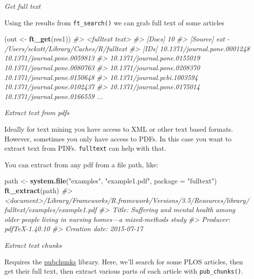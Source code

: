 \documentclass[author-year, review, 11pt]{components/elsarticle} %
\newenvironment{Shaded}{\begin{snugshade}}{\end{snugshade}}
\newcommand{\CommentTok}[1]{\textcolor[rgb]{0.56,0.35,0.01}{\textit{#1}}}
\newcommand{\DataTypeTok}[1]{\textcolor[rgb]{0.13,0.29,0.53}{#1}}
\newcommand{\KeywordTok}[1]{\textcolor[rgb]{0.13,0.29,0.53}{\textbf{#1}}}
\newcommand{\NormalTok}[1]{#1}
\newcommand{\StringTok}[1]{\textcolor[rgb]{0.31,0.60,0.02}{#1}}
\begin{document}
\emph{Get full text}

Using the results from \texttt{ft\_search()} we can grab full text of
some articles

\begin{Shaded}
\begin{Highlighting}[]
\NormalTok{(out <-}\StringTok{ }\KeywordTok{ft_get}\NormalTok{(res1))}
\CommentTok{#> <fulltext text>}
\CommentTok{#> [Docs] 10 }
\CommentTok{#> [Source] ext - /Users/sckott/Library/Caches/R/fulltext }
\CommentTok{#> [IDs] 10.1371/journal.pone.0001248 10.1371/journal.pone.0059813}
\CommentTok{#>      10.1371/journal.pone.0155019 10.1371/journal.pone.0080763}
\CommentTok{#>      10.1371/journal.pone.0208370 10.1371/journal.pone.0150648}
\CommentTok{#>      10.1371/journal.pcbi.1003594 10.1371/journal.pone.0102437}
\CommentTok{#>      10.1371/journal.pone.0175014 10.1371/journal.pone.0166559 ...}
\end{Highlighting}
\end{Shaded}

\emph{Extract text from pdfs}

Ideally for text mining you have access to XML or other text based
formats. However, sometimes you only have access to PDFs. In this case
you want to extract text from PDFs. \texttt{fulltext} can help with
that.

You can extract from any pdf from a file path, like:

\begin{Shaded}
\begin{Highlighting}[]
\NormalTok{path <-}\StringTok{ }\KeywordTok{system.file}\NormalTok{(}\StringTok{"examples"}\NormalTok{, }\StringTok{"example1.pdf"}\NormalTok{, }\DataTypeTok{package =} \StringTok{"fulltext"}\NormalTok{)}
\KeywordTok{ft_extract}\NormalTok{(path)}
\CommentTok{#> <document>/Library/Frameworks/R.framework/Versions/3.5/Resources/library/fulltext/examples/example1.pdf}
\CommentTok{#>   Title: Suffering and mental health among older people living in nursing homes---a mixed-methods study}
\CommentTok{#>   Producer: pdfTeX-1.40.10}
\CommentTok{#>   Creation date: 2015-07-17}
\end{Highlighting}
\end{Shaded}

\emph{Extract text chunks}

Requires the \href{https://github.com/ropensci/pubchunks}{pubchunks}
library. Here, we'll search for some PLOS articles, then get their full
text, then extract various parts of each article with
\texttt{pub\_chunks()}.
\end{document}
